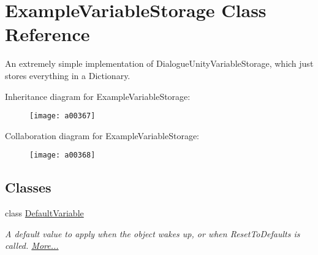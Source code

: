\hypertarget{a00085}{\section{Example\-Variable\-Storage Class Reference}
\label{a00085}
}


An extremely simple implementation of Dialogue\-Unity\-Variable\-Storage, which just stores everything in a Dictionary.  




Inheritance diagram for Example\-Variable\-Storage\-:
\nopagebreak
\begin{figure}[H]
\begin{center}
\leavevmode
\texttt{[image: a00367]}
\end{center}
\end{figure}


Collaboration diagram for Example\-Variable\-Storage\-:
\nopagebreak
\begin{figure}[H]
\begin{center}
\leavevmode
\texttt{[image: a00368]}
\end{center}
\end{figure}
\subsection*{Classes}
\begin{DoxyCompactItemize}
\item 
class \hyperlink{a00085_a00348}{Default\-Variable}
\begin{DoxyCompactList}\small\item\em A default value to apply when the object wakes up, or when Reset\-To\-Defaults is called.  \hyperlink{a00085_a00348}{More...}\end{DoxyCompactList}\end{DoxyCompactItemize}
